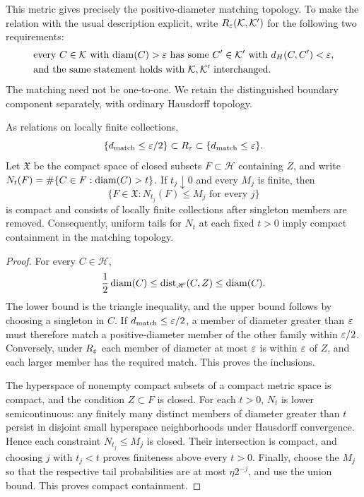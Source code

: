 This metric gives precisely the positive-diameter matching topology.
To make the relation with the usual description explicit, write
\(R_\varepsilon(\mathcal K,\mathcal K')\) for the following two requirements:
\begin{align*}
 &\text{every \(C\in\mathcal K\) with \(\operatorname{diam}(C)>\varepsilon\) has some
 \(C'\in\mathcal K'\) with \(d_H(C,C')<\varepsilon\),}\\
 &\text{and the same statement holds with \(\mathcal K,\mathcal K'\)
 interchanged.}
\end{align*}
The matching need not be one-to-one. We retain the distinguished boundary
component separately, with ordinary Hausdorff topology.

\begin{lemma}
\label{lem:matching-topology}
As relations on locally finite collections,
\[
 \{d_{\rm match}\le\varepsilon/2\}\subset R_\varepsilon
       \subset\{d_{\rm match}\le\varepsilon\}.
\]
Let \(\mathfrak X\) be the compact space of closed subsets
\(F\subset\mathscr H\) containing \(Z\), and write
\(N_t(F)=\#\{C\in F:\operatorname{diam}(C)>t\}\). If \(t_j\downarrow0\) and every
\(M_j\) is finite, then
\[
 \{F\in\mathfrak X:N_{t_j}(F)\le M_j\text{ for every }j\}
\]
is compact and consists of locally finite collections after singleton
members are removed. Consequently, uniform tails for \(N_t\) at each
fixed \(t>0\) imply compact containment in the matching topology.
\end{lemma}

\begin{proof}
For every \(C\in\mathscr H\),
\[
 \frac12\operatorname{diam}(C)\le \operatorname{dist}_{\mathscr H}(C,Z)\le\operatorname{diam}(C).
\]
The lower bound is the triangle inequality, and the upper bound follows
by choosing a singleton in \(C\). If \(d_{\rm match}\le\varepsilon/2\), a member
of diameter greater than \(\varepsilon\) must therefore match a positive-diameter
member of the other family within \(\varepsilon/2\). Conversely, under \(R_\varepsilon\)
each member of diameter at most \(\varepsilon\) is within \(\varepsilon\) of \(Z\), and
each larger member has the required match. This proves the inclusions.

The hyperspace of nonempty compact subsets of a compact metric space is
compact, and the condition \(Z\subset F\) is closed. For each \(t>0\),
\(N_t\) is lower semicontinuous: any finitely many distinct members of
diameter greater than \(t\) persist in disjoint small hyperspace
neighborhoods under Hausdorff convergence. Hence each constraint
\(N_{t_j}\le M_j\) is closed. Their intersection is compact, and choosing
\(j\) with \(t_j<t\) proves finiteness above every \(t>0\). Finally, choose
the \(M_j\) so that the respective tail probabilities are at most
\(\eta2^{-j}\), and use the union bound. This proves compact containment.
\end{proof}

